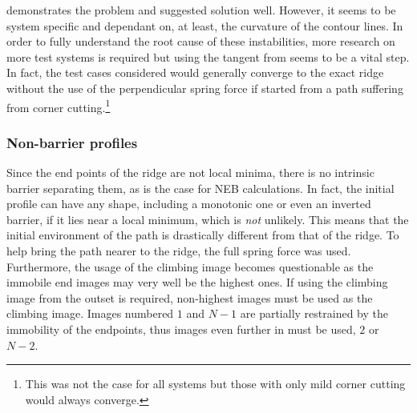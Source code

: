  demonstrates the problem and suggested solution well.
However, it seems to be system specific and dependant on, at least, the curvature of the contour lines.
In order to fully understand the root cause of these instabilities, more research on more test systems is required but using the tangent from  seems to be a vital step.
In fact, the test cases considered would generally converge to the exact ridge without the use of the perpendicular spring force if started from a path suffering from corner cutting.\footnote{This was not the case for all systems but those with only mild corner cutting would always converge.}

\subsubsection{Non-barrier profiles}
Since the end points of the ridge are not local minima, there is no intrinsic barrier separating them, as is the case for NEB calculations.
In fact, the initial profile can have any shape, including a monotonic one or even an inverted barrier, if it lies near a local minimum, which is \emph{not} unlikely.
This means that the initial environment of the path is drastically different from that of the ridge.
To help bring the path nearer to the ridge, the full spring force was used.
Furthermore, the usage of the climbing image becomes questionable as the immobile end images may very well be the highest ones.
If using the climbing image from the outset is required, non-highest images must be used as the climbing image.
Images numbered $1$ and $N-1$ are partially restrained by the immobility of the endpoints, thus images even further in must be used, $2$ or $N-2$.


